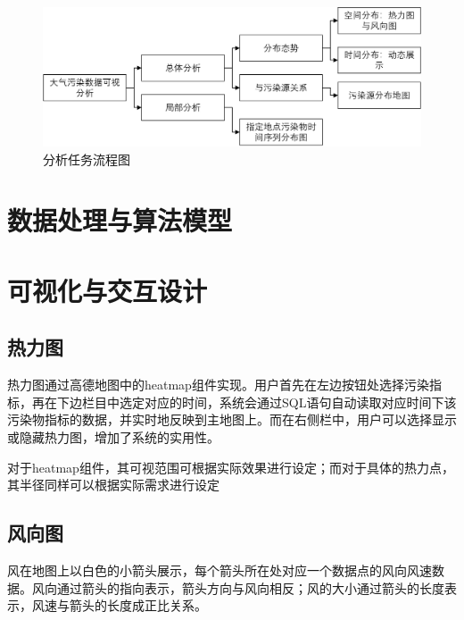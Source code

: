 \documentclass[UTF8]{ctexrep}
\begin{document}
	\begin{figure}[h!]
        \centering
        \includegraphics[width=14cm,keepaspectratio]{images/analyze_task.png}
        \caption{分析任务流程图}
        \label{fig:analyze_task}
   	\end{figure}
    	


    \section{数据处理与算法模型}

    \section{可视化与交互设计}

    \subsection{热力图}
	热力图通过高德地图中的heatmap组件实现。用户首先在左边按钮处选择污染指标，再在下边栏目中选定对应的时间，系统会通过SQL语句自动读取对应时间下该污染物指标的数据，并实时地反映到主地图上。而在右侧栏中，用户可以选择显示或隐藏热力图，增加了系统的实用性。
	\par
对于heatmap组件，其可视范围可根据实际效果进行设定；而对于具体的热力点，其半径同样可以根据实际需求进行设定
    

    \subsection{风向图}
    
	风在地图上以白色的小箭头展示，每个箭头所在处对应一个数据点的风向风速数据。风向通过箭头的指向表示，箭头方向与风向相反；风的大小通过箭头的长度表示，风速与箭头的长度成正比关系。
    
\end{document}
